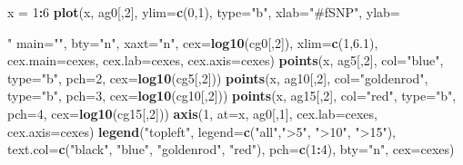 \documentclass[]{article}
\newenvironment{Shaded}{\begin{snugshade}}{\end{snugshade}}
\newcommand{\KeywordTok}[1]{\textcolor[rgb]{0.13,0.29,0.53}{\textbf{#1}}}
\newcommand{\DataTypeTok}[1]{\textcolor[rgb]{0.13,0.29,0.53}{#1}}
\newcommand{\DecValTok}[1]{\textcolor[rgb]{0.00,0.00,0.81}{#1}}
\newcommand{\FloatTok}[1]{\textcolor[rgb]{0.00,0.00,0.81}{#1}}
\newcommand{\StringTok}[1]{\textcolor[rgb]{0.31,0.60,0.02}{#1}}
\newcommand{\OperatorTok}[1]{\textcolor[rgb]{0.81,0.36,0.00}{\textbf{#1}}}
\newcommand{\NormalTok}[1]{#1}
\begin{document}
\begin{Shaded}
\begin{Highlighting}[]
{\NormalTok{x =}\StringTok{ }\DecValTok{1}\OperatorTok{:}\DecValTok{6}
\KeywordTok{plot}\NormalTok{(x, ag0[,}\DecValTok{2}\NormalTok{], }\DataTypeTok{ylim=}\KeywordTok{c}\NormalTok{(}\DecValTok{0}\NormalTok{,}\DecValTok{1}\NormalTok{), }\DataTypeTok{type=}\StringTok{"b"}\NormalTok{, }\DataTypeTok{xlab=}\StringTok{"#fSNP"}\NormalTok{, }\DataTypeTok{ylab=}\StringTok{"%p(R)<p(T)"}\NormalTok{, }
      \DataTypeTok{main=}\StringTok{""}\NormalTok{, }\DataTypeTok{bty=}\StringTok{"n"}\NormalTok{, }\DataTypeTok{xaxt=}\StringTok{"n"}\NormalTok{, }\DataTypeTok{cex=}\KeywordTok{log10}\NormalTok{(cg0[,}\DecValTok{2}\NormalTok{]), }
      \DataTypeTok{xlim=}\KeywordTok{c}\NormalTok{(}\DecValTok{1}\NormalTok{,}\FloatTok{6.1}\NormalTok{), }\DataTypeTok{cex.main=}\NormalTok{cexes, }\DataTypeTok{cex.lab=}\NormalTok{cexes, }\DataTypeTok{cex.axis=}\NormalTok{cexes)}
\KeywordTok{points}\NormalTok{(x, ag5[,}\DecValTok{2}\NormalTok{], }\DataTypeTok{col=}\StringTok{"blue"}\NormalTok{, }\DataTypeTok{type=}\StringTok{"b"}\NormalTok{, }\DataTypeTok{pch=}\DecValTok{2}\NormalTok{, }\DataTypeTok{cex=}\KeywordTok{log10}\NormalTok{(cg5[,}\DecValTok{2}\NormalTok{]))}
\KeywordTok{points}\NormalTok{(x, ag10[,}\DecValTok{2}\NormalTok{], }\DataTypeTok{col=}\StringTok{"goldenrod"}\NormalTok{, }\DataTypeTok{type=}\StringTok{"b"}\NormalTok{, }\DataTypeTok{pch=}\DecValTok{3}\NormalTok{, }\DataTypeTok{cex=}\KeywordTok{log10}\NormalTok{(cg10[,}\DecValTok{2}\NormalTok{]))}
\KeywordTok{points}\NormalTok{(x, ag15[,}\DecValTok{2}\NormalTok{], }\DataTypeTok{col=}\StringTok{"red"}\NormalTok{, }\DataTypeTok{type=}\StringTok{"b"}\NormalTok{, }\DataTypeTok{pch=}\DecValTok{4}\NormalTok{, }\DataTypeTok{cex=}\KeywordTok{log10}\NormalTok{(cg15[,}\DecValTok{2}\NormalTok{]))}
\KeywordTok{axis}\NormalTok{(}\DecValTok{1}\NormalTok{, }\DataTypeTok{at=}\NormalTok{x, ag0[,}\DecValTok{1}\NormalTok{], }\DataTypeTok{cex.lab=}\NormalTok{cexes, }\DataTypeTok{cex.axis=}\NormalTok{cexes)}
\KeywordTok{legend}\NormalTok{(}\StringTok{"topleft"}\NormalTok{, }\DataTypeTok{legend=}\KeywordTok{c}\NormalTok{(}\StringTok{"all"}\NormalTok{,}\StringTok{">5"}\NormalTok{, }\StringTok{">10"}\NormalTok{, }\StringTok{">15"}\NormalTok{), }
\DataTypeTok{text.col=}\KeywordTok{c}\NormalTok{(}\StringTok{"black"}\NormalTok{, }\StringTok{"blue"}\NormalTok{, }\StringTok{"goldenrod"}\NormalTok{, }\StringTok{"red"}\NormalTok{), }\DataTypeTok{pch=}\KeywordTok{c}\NormalTok{(}\DecValTok{1}\OperatorTok{:}\DecValTok{4}\NormalTok{), }\DataTypeTok{bty=}\StringTok{"n"}\NormalTok{, }\DataTypeTok{cex=}\NormalTok{cexes)}


}}
\end{Highlighting}
\end{Shaded}
\end{document}
